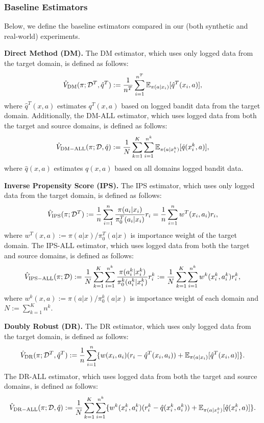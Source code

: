 \subsubsection{Baseline Estimators}
Below, we define the baseline estimators compared in our (both synthetic and real-world) experiments.

\textbf{Direct Method (DM).} The DM estimator, which uses only logged data from the target domain, is defined as follows:
    $$\hat{V}_{\rm{DM}}(\pi;\mathcal{D}^T, \hat{q}^T):= \frac{1}{n^T}\sum_{i=1}^{n^T}\mathbb{E}_{\pi(a|x_i)}[\hat{q}^T(x_i,a)],$$
where $\hat{q}^T(x, a)$ estimates $q^T(x, a)$ based on logged bandit data from the target domain. Additionally, the DM-ALL estimator, which uses logged data from both the target and source domains, is defined as follows:
    $$\hat{V}_{\rm{DM-ALL}}(\pi;\mathcal{D}, \hat{q}):= \frac{1}{N}\sum_{k=1}^K\sum_{i=1}^{n^k}\mathbb{E}_{\pi(a|x_i^k)}[\hat{q}(x_i^k,a)],$$
where $\hat{q}(x, a)$ estimates $q(x, a)$ based on all domains logged bandit data.

\textbf{Inverse Propensity Score (IPS).} The IPS estimator, which uses only logged data from the target domain, is defined as follows:
    $$\hat{V}_{\rm{IPS}}(\pi;\mathcal{D}^T):=\frac{1}{n}\sum_{i=1}^{n}\frac{\pi(a_{i}|x_{i})}{\pi_0^T(a_{i}|x_{i})}r_{i}=\frac{1}{n}\sum_{i=1}^{n}w^T(x_{i},a_{i})r_{i},$$
where $w^T(x,a):=\pi(a|x) / \pi_0^T(a|x)$ is importance weight of the target domain. 
The IPS-ALL estimator, which uses logged data from both the target and source domains, is defined as follows:
    $$\hat{V}_{\rm{IPS-ALL}}(\pi;\mathcal{D}):=\frac{1}{N}\sum_{k=1}^K\sum_{i=1}^{n^{k}}\frac{\pi(a_{i}^k|x_{i}^k)}{\pi_0^k(a_{i}^k|x_{i}^k)}r_{i}^{k}:=\frac{1}{N}\sum_{k=1}^K\sum_{i=1}^{n^{k}}w^{k}(x_{i}^{k},a_{i}^{k})r_{i}^{k},$$
where $w^k(x,a):=\pi(a|x) / \pi_0^k(a|x)$ is importance weight of each domain and $N:=\sum_{k=1}^Kn^{k}$. 

\textbf{Doubly Robust (DR).} The DR estimator, which uses only logged data from the target domain, is defined as follows:
    $$\hat{V}_{\rm{DR}}(\pi;\mathcal{D}^T, \hat{q}^T):=\frac{1}{n}\sum_{i=1}^{n}\{w(x_{i},a_{i})(r_{i}-\hat{q}^T(x_{i},a_{i}))+ \mathbb{E}_{\pi(a|x_i)}\lbrack \hat{q}^T(x_i,a)\rbrack \}.$$
The DR-ALL estimator, which uses logged data from both the target and source domains, is defined as follows:
    $$\hat{V}_{\rm{DR-ALL}}(\pi;\mathcal{D}, \hat{q})
    :=\frac{1}{N} \sum_{k=1}^K\sum_{i=1}^{n^{k}}\{w^{k}(x_{i}^{k},a_{i}^{k})(r_{i}^{k}-\hat{q}(x_{i}^{k},a_{i}^{k}))+ \mathbb{E}_{\pi(a|x_i^k)}\lbrack \hat{q}(x_i^k,a)\rbrack \}.$$


